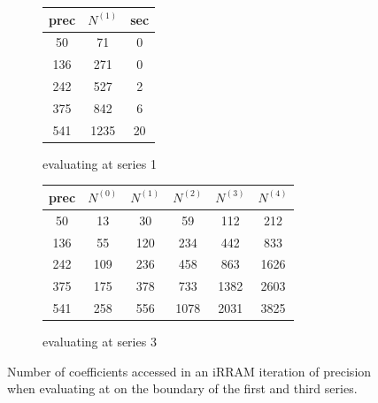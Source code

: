 		\begin{figure}[h]
			 \centering
			\begin{subfigure}{0.48\textwidth}
				\centering
			  	\begin{tabular}{|c|c|c|}
			  	\hline
			  	prec & $N^{(1)}$ & sec \\
			  	\hline
			  	50 & 71 & 0\\
			  	\hline
			  	136 & 271 & 0\\
			  	\hline
			  	242 & 527 & 2\\
			  	\hline
			  	375 & 842 & 6\\
			  	\hline
			  	541 & 1235 & 20\\
			  	\hline
			  	\end{tabular}
			  	\caption{evaluating at series 1}
		  	\end{subfigure}
			\begin{subfigure}{0.48\textwidth}
				\centering
			  	\begin{tabular}{|c|c|c|c|c|c|}
			  	\hline
			  	prec & $N^{(0)}$ & $N^{(1)}$ &$N^{(2)}$ & $N^{(3)}$ & $N^{(4)}$ \\
			  	\hline
			  	50 & 13 & 30 & 59 & 112 & 212\\
			  	\hline
			  	136 & 55 & 120 & 234 & 442 & 833\\
			  	\hline
			  	242 & 109 & 236 & 458 & 863 & 1626\\
			  	\hline
			  	375 & 175 & 378 & 733 & 1382 & 2603\\
			  	\hline
			  	541 & 258 & 556 & 1078 & 2031 & 3825\\
			  	\hline
			  	\end{tabular}
			  	\caption{evaluating at series 3}
		  	\end{subfigure}
			\caption{Number of coefficients accessed in an iRRAM iteration of precision \sprec when evaluating at on the boundary of the first and third series.}
			\label{fig:xinv coeff 0 dep on n}
		\end{figure}

